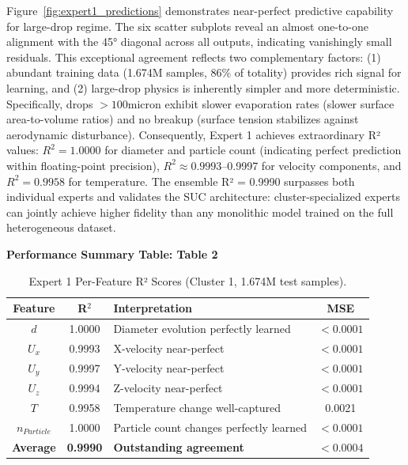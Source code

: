 \documentclass[letterpaper,twocolumn,10pt]{article}
\begin{document}
Figure~\ref{fig:expert1_predictions} demonstrates near-perfect predictive capability for large-drop regime. The six scatter subplots reveal an almost one-to-one alignment with the 45° diagonal across all outputs, indicating vanishingly small residuals. This exceptional agreement reflects two complementary factors: (1) abundant training data (1.674M samples, 86\% of totality) provides rich signal for learning, and (2) large-drop physics is inherently simpler and more deterministic. Specifically, drops $> 100$micron exhibit slower evaporation rates (slower surface area-to-volume ratios) and no breakup (surface tension stabilizes against aerodynamic disturbance). Consequently, Expert 1 achieves extraordinary R² values: $R^2 = 1.0000$ for diameter and particle count (indicating perfect prediction within floating-point precision), $R^2 \approx 0.9993$--0.9997 for velocity components, and $R^2 = 0.9958$ for temperature. The ensemble R² = 0.9990 surpasses both individual experts and validates the SUC architecture: cluster-specialized experts can jointly achieve higher fidelity than any monolithic model trained on the full heterogeneous dataset.

\textbf{Performance Summary Table: Table 2}
\begin{table}[h!]
    \centering
    \renewcommand{\arraystretch}{1.4}
    \small
    \begin{tabular}{|c|c|p{2.8cm}|c|}
        \hline
        \textbf{Feature} & \textbf{R}$^2$ & \textbf{Interpretation} & \textbf{MSE} \\
        \hline
        $d$ & 1.0000 & Diameter evolution perfectly learned & $< 0.0001$ \\
        $U_x$ & 0.9993 & X-velocity near-perfect & $< 0.0001$ \\
        $U_y$ & 0.9997 & Y-velocity near-perfect & $< 0.0001$ \\
        $U_z$ & 0.9994 & Z-velocity near-perfect & $< 0.0001$ \\
        $T$ & 0.9958 & Temperature change well-captured & 0.0021 \\
        $n_{Particle}$ & 1.0000 & Particle count changes perfectly learned & $< 0.0001$ \\
        \hline
        \textbf{Average} & \textbf{0.9990} & \textbf{Outstanding agreement} & \textbf{$< 0.0004$} \\
        \hline
    \end{tabular}
    \caption{Expert 1 Per-Feature R² Scores (Cluster 1, 1.674M test samples).}
    \label{tab:expert1_r2}
\end{table}
\end{document}
